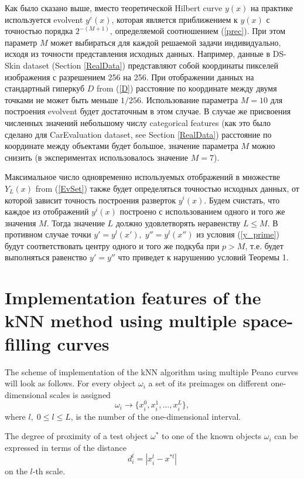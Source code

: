 \documentclass[entropy,article,submit,moreauthors,pdftex]{Definitions/mdpi}
\begin{document}
\begin{paracol}{2}
\linenumbers
\switchcolumn

Как было сказано выше, вместо теоретической Hilbert curve $y(x)$ на практике используется evolvent $y^c(x)$, которая является приближением к $y(x)$ с точностью порядка $2^{-(M+1)}$, определяемой соотношением (\ref{prec}). При этом параметр $M$ может выбираться для каждой решаемой задачи индивидуально, исходя из точности представления исходных данных.
Например, данные в  DS-Skin dataset (Section \ref{RealData}) представляют собой координаты пикселей изображения с разрешением 256 на 256. При отображении данных на стандартный гиперкуб $D$ from (\ref{D}) расстояние по координате между двумя точками не может быть меньше $1/256$. Использование параметра $M=10$ для построения evolvent будет достаточным в этом случае. 
В случае же присвоения численных значений небольшому числу categorical features (как это было сделано для CarEvaluation dataset, see Section \ref{RealData}) расстояние по координате между объектами будет большое, значение параметра $M$ можно снизить (в экспериментах использовалось значение $M=7$).

Максимальное число одновременно используемых отображений в множестве $Y_L(x)$ from (\ref{EvSet}) также будет определяться точностью исходных данных, от которой зависит точность построения разверток $y^i(x)$.
Будем счистать, что каждое из отображений $y^i(x)$ построено с использованием одного и того же значения $M$. Тогда значение $L$ должно удовлетворять неравенству $L \leq M$. В противном случае точки $y' = y^l(x'),\; y''=y^l(x'')$ из условия (\ref{y_prime}) будут соответствовать центру одного и того же подкуба при $p>M$, т.е. будет выполняться равенство $y' = y''$  что приведет к нарушению условий Теоремы 1. 

\section{Implementation features of the kNN method using multiple space-filling curves}\label{knnme}

The scheme of implementation of the kNN algorithm using multiple Peano curves will look as follows.
For every object $\omega_i$ a set of its preimages on different one-dimensional scales is assigned 
\[
\omega_i \rightarrow \{ x_i^0, x_i^1, ..., x_i^L \},
\] 
where $l, \; 0 \leq l \leq L$, is the number of the one-dimensional interval.

The degree of proximity of a test object $\omega^*$ to one of the known objects $\omega_i$ can be expressed in terms of the distance
\[
d_i^l = |x_i^l - x^{*l}|
\]
on the $l$-th scale.


\end{paracol}
\end{document}

